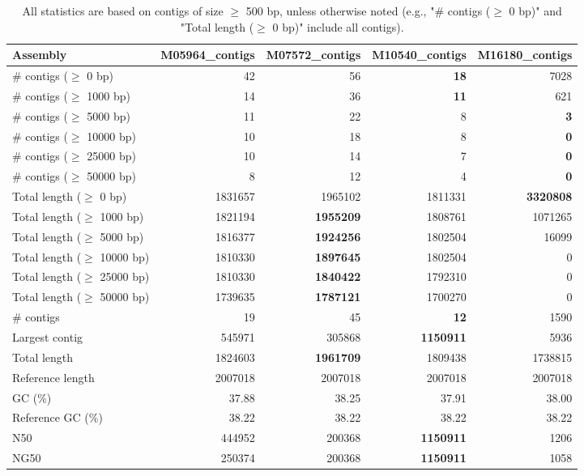 \documentclass[12pt,a4paper]{article}
\begin{document}
\begin{table}[ht]
\begin{center}
\caption{All statistics are based on contigs of size $\geq$ 500 bp, unless otherwise noted (e.g., "\# contigs ($\geq$ 0 bp)" and "Total length ($\geq$ 0 bp)" include all contigs).}
\begin{tabular}{|l*{4}{|r}|}
\hline
Assembly & M05964\_contigs & M07572\_contigs & M10540\_contigs & M16180\_contigs \\ \hline
\# contigs ($\geq$ 0 bp) & 42 & 56 & {\bf 18} & 7028 \\ \hline
\# contigs ($\geq$ 1000 bp) & 14 & 36 & {\bf 11} & 621 \\ \hline
\# contigs ($\geq$ 5000 bp) & 11 & 22 & 8 & {\bf 3} \\ \hline
\# contigs ($\geq$ 10000 bp) & 10 & 18 & 8 & {\bf 0} \\ \hline
\# contigs ($\geq$ 25000 bp) & 10 & 14 & 7 & {\bf 0} \\ \hline
\# contigs ($\geq$ 50000 bp) & 8 & 12 & 4 & {\bf 0} \\ \hline
Total length ($\geq$ 0 bp) & 1831657 & 1965102 & 1811331 & {\bf 3320808} \\ \hline
Total length ($\geq$ 1000 bp) & 1821194 & {\bf 1955209} & 1808761 & 1071265 \\ \hline
Total length ($\geq$ 5000 bp) & 1816377 & {\bf 1924256} & 1802504 & 16099 \\ \hline
Total length ($\geq$ 10000 bp) & 1810330 & {\bf 1897645} & 1802504 & 0 \\ \hline
Total length ($\geq$ 25000 bp) & 1810330 & {\bf 1840422} & 1792310 & 0 \\ \hline
Total length ($\geq$ 50000 bp) & 1739635 & {\bf 1787121} & 1700270 & 0 \\ \hline
\# contigs & 19 & 45 & {\bf 12} & 1590 \\ \hline
Largest contig & 545971 & 305868 & {\bf 1150911} & 5936 \\ \hline
Total length & 1824603 & {\bf 1961709} & 1809438 & 1738815 \\ \hline
Reference length & 2007018 & 2007018 & 2007018 & 2007018 \\ \hline
GC (\%) & 37.88 & 38.25 & 37.91 & 38.00 \\ \hline
Reference GC (\%) & 38.22 & 38.22 & 38.22 & 38.22 \\ \hline
N50 & 444952 & 200368 & {\bf 1150911} & 1206 \\ \hline
NG50 & 250374 & 200368 & {\bf 1150911} & 1058 \\ \hline

\end{tabular}
\end{center}
\end{table}
\end{document}
